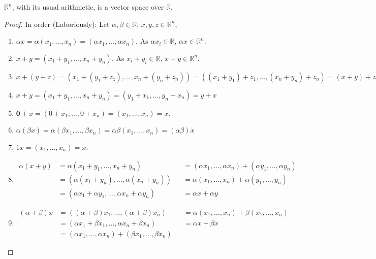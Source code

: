 \documentclass[crop=false,class=book,oneside]{standalone}
\begin{document}
            \begin{theorem}
            $\mathbb{R}^n$, with its usual arithmetic, is a vector space over $\mathbb{R}$.
            \end{theorem}
            \begin{proof}
            In order (Laboriously): Let $\alpha, \beta \in \mathbb{R}$, $x,y,z\in \mathbb{R}^n$,
            \begin{enumerate}
            \item $\alpha x = \alpha(x_1,\hdots,x_n) = (\alpha x_1,\hdots, \alpha x_n)$. As $\alpha x_i \in \mathbb{R}$, $\alpha x \in \mathbb{R}^n$.
            \item $x+y = (x_1+y_1,\hdots,x_n+y_n)$. As $x_i+y_i \in \mathbb{R}$, $x+y\in \mathbb{R}^n$.
            \item $x+(y+z) = (x_1+(y_1+z_z),\hdots, x_n+(y_n+z_n)) = ((x_1+y_1)+z_1,\hdots, (x_n+y_n)+z_n) = (x+y)+z$
            \item $x+y = (x_1+y_1,\hdots,x_n+y_n) = (y_1+x_1,\hdots, y_n+x_n)=y+x$
            \item $\mathbf{0}+x = (0+x_1,\hdots, 0+x_n) = (x_1,\hdots, x_n) = x$.
            \item $\alpha(\beta x) = \alpha(\beta x_1,\hdots, \beta x_n) = \alpha \beta (x_1,\hdots, x_n) = (\alpha \beta) x$
            \item $1 x = (x_1,\hdots, x_n) = x$.
            \item
                \begin{align*}
                    \alpha(x+y) &= \alpha(x_1+y_1,\hdots, x_n+y_n) & &= (\alpha x_1, \hdots, \alpha x_n) + (\alpha y_1,\hdots, \alpha y_n)\\
                    &= (\alpha(x_1+y_n),\hdots, \alpha(x_n+y_n)) & &= \alpha(x_1,\hdots, x_n)+\alpha(y_1,\hdots, y_n)\\
                    &= (\alpha x_1+\alpha y_1,\hdots, \alpha x_n + \alpha y_n) & &= \alpha x + \alpha y
                \end{align*} 
            \item
                \begin{align*}
                    (\alpha + \beta)x &= ((\alpha+\beta)x_1,\hdots, (\alpha+\beta)x_n) & &= \alpha (x_1, \hdots, x_n)+\beta (x_1, \hdots, x_n)\\
                    &= (\alpha x_1 + \beta x_1,\hdots, \alpha x_n + \beta x_n) & &= \alpha x+\beta x\\
                    &= (\alpha x_1,\hdots, \alpha x_n) + (\beta x_1,\hdots, \beta x_n)
                \end{align*}
            \end{enumerate}
            \end{proof}
\end{document}
